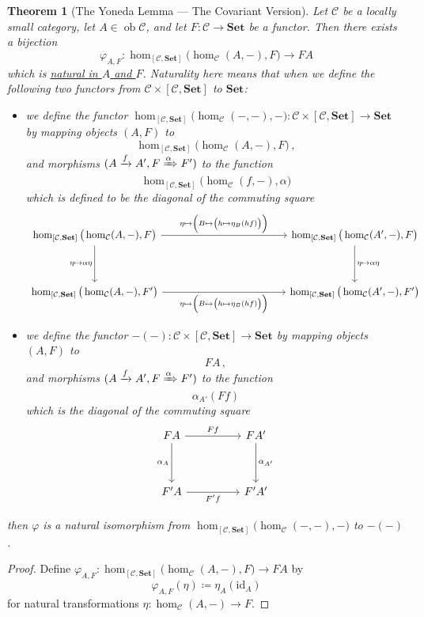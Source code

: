 \documentclass[a4paper,11pt]{article}
\theoremstyle{break_italics}
\newtheorem*{theorem*}{Theorem}
\theoremstyle{break_upright}
\theoremstyle{remark}
\newcommand{\id}{\mathrm{id}}
\newcommand{\ob}{\operatorname{ob}}
\newcommand{\C}{\mathcal{C}}
\newcommand{\Set}{\mathbf{Set}}
\begin{document}
\begin{theorem*}[The Yoneda Lemma --- The Covariant Version]
	Let $\C$ be a locally small category, let $A \in \ob\C$, and let $F \colon \C \to \Set$ be a functor. Then there exists a bijection
	\[
		\varphi_{A,F} \colon \hom_{[\C, \Set]}\big(\hom_\C(A, -), F\big) \to FA
	\]
	which is \underline{natural in $A$ and $F$}. Naturality here means that when we define the following two functors from $\C \times [\C, \Set]$ to $\Set$:
	\begin{itemize}
		\item we define the functor $\hom_{[\C,\Set]}\big(\hom_\C(-,-),-\big) \colon \C \times [\C, \Set] \to \Set$ by mapping objects $(A, F)$ to
		\[
			\hom_{[\C, \Set]}\big(\hom_\C(A, -), F\big)\,,
		\]
		and morphisms $(A\xrightarrow{f}A', F \xRightarrow{\alpha} F')$ to the function
		\[
			\hom_{[\C,\Set]}\big(\hom_\C(f,-),\alpha\big)
		\]
		which is defined to be the diagonal of the commuting square
		\[
	\begin{tikzcd}
\hom_{[\C,\Set]}\big(\hom_\C(A,-),F\big) \arrow[rrrrr, "\eta \mapsto \Big(B \mapsto \big(h \mapsto \eta_B(hf)\big) \Big)"] \arrow[dd, "{\eta \mapsto \alpha\eta}"'] &  &  &  &  & \hom_{[\C,\Set]}\big(\hom_\C(A',-),F\big) \arrow[dd, "{\eta \mapsto \alpha\eta}"] \\
                                                            &  &  &  &  &                                      \\
\hom_{[\C,\Set]}\big(\hom_\C(A,-),F'\big) \arrow[rrrrr, "\eta \mapsto \Big(B \mapsto \big(h \mapsto \eta_B(hf)\big) \Big)"']                        &  &  &  &  & \hom_{[\C,\Set]}\big(\hom_\C(A', -), F'\big)                                
\end{tikzcd}
	\]
		\item we define the functor $-(-) \colon \C \times [\C, \Set] \to \Set$ by mapping objects $(A, F)$ to 
		\[
			FA\,,
		\]
		and morphisms $(A\xrightarrow{f}A', F \xRightarrow{\alpha} F')$ to the function
		\[
			\alpha_{A'}(Ff)
		\]
		which is the diagonal of the commuting square
		\[
		\begin{tikzcd}
FA \arrow[rr, "Ff"] \arrow[dd, "\alpha_A"'] &  & FA' \arrow[dd, "\alpha_{A'}"] \\
                                            &  &                               \\
F'A \arrow[rr, "F'f"']                      &  & F'A'                         
\end{tikzcd}
		\]
	\end{itemize}
	then $\varphi$ is a natural isomorphism from $\hom_{[\C,\Set]}\big(\hom_\C(-,-),-\big)$ to $-(-)$.
\end{theorem*}
\begin{proof}
Define $\varphi_{A,F} \colon \hom_{[\C, \Set]}\big(\hom_\C(A, -), F\big) \to FA$ by
\[
	\varphi_{A,F}(\eta) \coloneqq \eta_A(\id_A)
\]
for natural transformations $\eta \colon \hom_\C(A,-) \to F$.
\end{proof}
\end{document}
